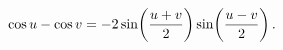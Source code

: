 \[\mathop{\cos\/}\nolimits u-\mathop{\cos\/}\nolimits v=-2\mathop{\sin\/}%
\nolimits\!\left(\frac{u+v}{2}\right)\mathop{\sin\/}\nolimits\!\left(\frac{u-v%
}{2}\right).\]